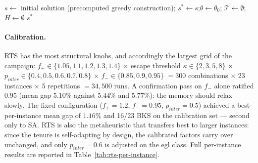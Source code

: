 \begin{algorithm}[htbp]
\DontPrintSemicolon
\caption{Reactive Tabu Search for the CARP}
\label{alg:rts-carp}


\BlankLine
$s \leftarrow$ initial solution (precomputed greedy construction);\quad
$s^{*} \leftarrow s$;\quad $\theta \leftarrow \theta_0$;\quad
$\mathcal{T} \leftarrow \emptyset$;\quad $H \leftarrow \emptyset$
\Return $s^{*}$\;
\end{algorithm}

\paragraph{Calibration.} RTS has the most structural knobs, and accordingly
the largest grid of the campaign: $f_{+} \in \{1.05, 1.1, 1.2, 1.3, 1.4\}$
$\times$ escape threshold $\kappa \in \{2, 3, 5, 8\}$ $\times$ $p_{inter}
\in \{0.4, 0.5, 0.6, 0.7, 0.8\}$ $\times$ $f_{-} \in \{0.85, 0.9, 0.95\}$
$= 300$ combinations $\times$ 23 instances $\times$ 5 repetitions
$= 34{,}500$ runs. A confirmation pass on $f_{-}$ alone ratified $0.95$
(mean gap $5.10\%$ against $5.44\%$ and $5.77\%$): the memory should relax
slowly. The fixed configuration ($f_{+} = 1.2$, $f_{-} = 0.95$,
$p_{inter} = 0.5$) achieved a best-per-instance mean gap of $1.16\%$ and
16/23 BKS on the calibration set --- second only to SA. RTS is also the
metaheuristic that transfers best to larger instances: since the tenure is
self-adapting by design, the calibrated factors carry over unchanged, and
only $p_{inter} = 0.6$ is adjusted on the egl class. Full per-instance
results are reported in Table~\ref{tab:rts-per-instance}.
